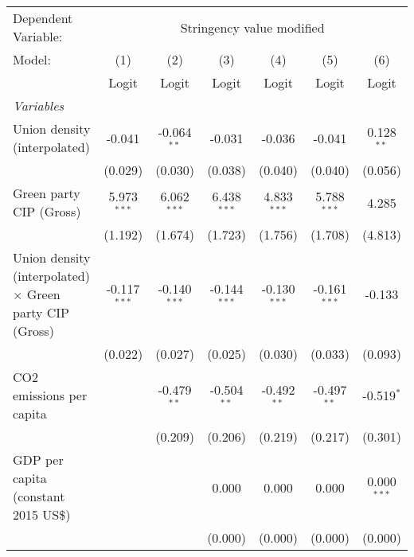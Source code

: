
\begingroup
\centering
\begin{tabular}{lcccccc}
   \toprule
   Dependent Variable: & \multicolumn{6}{c}{Stringency value modified}\\
   Model:                                                         & (1)            & (2)            & (3)            & (4)            & (5)            & (6)\\  
                                                                  &  Logit         & Logit          & Logit          & Logit          & Logit          & Logit\\  
   \midrule
   \emph{Variables}\\
   Union density (interpolated)                                   & -0.041         & -0.064$^{**}$  & -0.031         & -0.036         & -0.041         & 0.128$^{**}$\\   
                                                                  & (0.029)        & (0.030)        & (0.038)        & (0.040)        & (0.040)        & (0.056)\\   
   Green party CIP (Gross)                                        & 5.973$^{***}$  & 6.062$^{***}$  & 6.438$^{***}$  & 4.833$^{***}$  & 5.788$^{***}$  & 4.285\\   
                                                                  & (1.192)        & (1.674)        & (1.723)        & (1.756)        & (1.708)        & (4.813)\\   
   Union density (interpolated) $\times$ Green party CIP (Gross)  & -0.117$^{***}$ & -0.140$^{***}$ & -0.144$^{***}$ & -0.130$^{***}$ & -0.161$^{***}$ & -0.133\\   
                                                                  & (0.022)        & (0.027)        & (0.025)        & (0.030)        & (0.033)        & (0.093)\\   
   CO2 emissions per capita                                       &                & -0.479$^{**}$  & -0.504$^{**}$  & -0.492$^{**}$  & -0.497$^{**}$  & -0.519$^{*}$\\   
                                                                  &                & (0.209)        & (0.206)        & (0.219)        & (0.217)        & (0.301)\\   
   GDP per capita (constant 2015 US\$)                            &                &                & 0.000          & 0.000          & 0.000          & 0.000$^{***}$\\   
                                                                  &                &                & (0.000)        & (0.000)        & (0.000)        & (0.000)\\   

\end{tabular}
